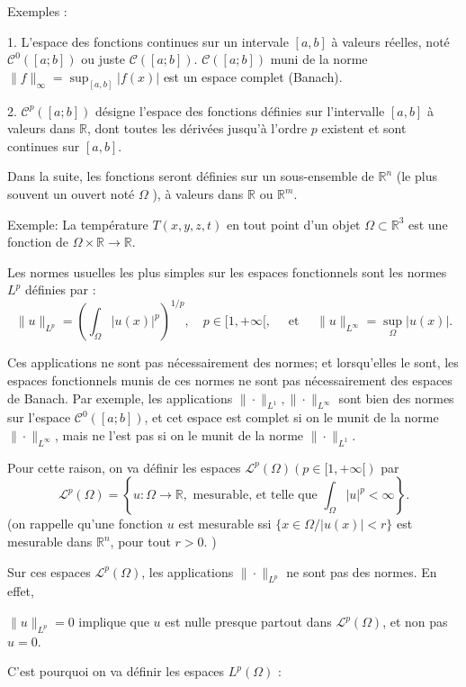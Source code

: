 Exemples :

1. L'espace des fonctions continues sur un intervale $[a, b]$ à valeurs réelles, noté $\mathcal{C}^{0}([a ; b])$ ou juste $\mathcal{C}([a ; b])$.   $\mathcal{C}([a ; b])$ muni de la norme $\|f\|_{\infty}= \sup_{[a, b]} |f(x)|$ est un espace complet (Banach).

2.  $\mathcal{C}^{p}([a ; b])$ désigne l'espace des fonctions définies sur l'intervalle $[a, b]$ à valeurs dans $\mathbb{R}$, dont toutes les dérivées jusqu'à l'ordre $p$ existent et sont continues sur $[a, b]$.

Dans la suite, les fonctions seront définies sur un sous-ensemble de $\mathbb{R}^{n}$ (le plus souvent un ouvert noté $\Omega$ ), à valeurs dans $\mathbb{R}$ ou $\mathbb{R}^{m}$.

Exemple: La température $T(x, y, z, t)$ en tout point d'un objet $\Omega \subset \mathbb{R}^{3}$ est une fonction de $\Omega \times \mathbb{R} \longrightarrow \mathbb{R}$.

Les normes usuelles les plus simples sur les espaces fonctionnels sont les normes $L^p$  définies par :
$$
\|u\|_{L^p}=\left(\int_{\Omega}|u(x)|^{p}\right)^{1 / p},  \quad p \in[1,+\infty[, \quad \text{ et } \quad\|u\|_{L^{\infty}}= \sup_{\Omega} |u(x)|. 
$$

Ces applications  ne sont pas nécessairement des normes; et lorsqu'elles le sont, les espaces fonctionnels munis de ces normes ne sont pas nécessairement des espaces de Banach. Par exemple, les applications  $\|\cdot \|_{L^1}, \|\cdot \|_{L^{\infty}}$  sont bien des normes sur l'espace $\mathcal{C}^{0}([a ; b])$, et cet espace est complet si on le munit de la norme $\|\cdot \|_{L^{\infty}}$, mais ne l'est pas si on le munit de la norme $\|\cdot \|_{L^1}$.

Pour cette raison, on va définir les espaces $\mathcal{L}^{p}(\Omega)(p \in[1,+\infty[)$ par
$$
\mathcal{L}^{p}(\Omega)=\left\{u: \Omega \rightarrow \mathbb{R}, \text { mesurable, et telle que } \int_{\Omega}|u|^{p}<\infty\right\}.
$$
(on rappelle qu'une fonction $u$ est mesurable ssi $\{x \in \Omega /|u(x)|<r\}$ est mesurable dans $\mathbb{R}^n$,  pour tout $ r>0$. )

Sur ces espaces $\mathcal{L}^{p}(\Omega)$, les applications  $\|\cdot \|_{L^p}$ ne sont pas des normes. En effet, 

$\|u\|_{L^{p}}=0$ implique que $u$ est nulle presque partout dans $\mathcal{L}^{p}(\Omega)$, et non pas $u=0$. 

C'est pourquoi on va définir les espaces $L^p(\Omega)$ :

